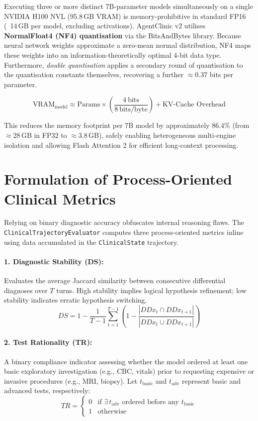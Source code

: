 Executing three or more distinct 7B-parameter models simultaneously on a single NVIDIA H100 NVL (95.8\,GB VRAM) is memory-prohibitive in standard FP16 (~14\,GB per model, excluding activations). AgentClinic v2 utilises \textbf{NormalFloat4 (NF4) quantisation} via the BitsAndBytes library. Because neural network weights approximate a zero-mean normal distribution, NF4 maps these weights into an information-theoretically optimal 4-bit data type. Furthermore, \textit{double quantisation} applies a secondary round of quantisation to the quantisation constants themselves, recovering a further $\approx$0.37 bits per parameter.

\begin{equation}
\text{VRAM}_{\text{model}} \approx \text{Params} \times \left( \frac{4\ \text{bits}}{8\ \text{bits/byte}} \right) + \text{KV-Cache Overhead}
\end{equation}

This reduces the memory footprint per 7B model by approximately 86.4\% (from $\approx$28\,GB in FP32 to $\approx$3.8\,GB), safely enabling heterogeneous multi-engine isolation and allowing Flash Attention 2 for efficient long-context processing.

\section{Formulation of Process-Oriented Clinical Metrics}

Relying on binary diagnostic accuracy obfuscates internal reasoning flaws. The \texttt{ClinicalTrajectoryEvaluator} computes three process-oriented metrics inline using data accumulated in the \texttt{ClinicalState} trajectory.

\paragraph{1. Diagnostic Stability (DS):} Evaluates the average Jaccard similarity between consecutive differential diagnoses over $T$ turns. High stability implies logical hypothesis refinement; low stability indicates erratic hypothesis switching.
\begin{equation}
DS = 1 - \frac{1}{T - 1} \sum_{t=1}^{T-1} \left( 1 - \frac{|DDx_t \cap DDx_{t+1}|}{|DDx_t \cup DDx_{t+1}|} \right)
\end{equation}

\paragraph{2. Test Rationality (TR):} A binary compliance indicator assessing whether the model ordered at least one basic exploratory investigation (e.g., CBC, vitals) prior to requesting expensive or invasive procedures (e.g., MRI, biopsy). Let $t_{\text{basic}}$ and $t_{\text{adv}}$ represent basic and advanced tests, respectively:
\begin{equation}
TR = \begin{cases}
0 & \text{if } \exists\, t_{\text{adv}} \text{ ordered before any } t_{\text{basic}} \\
1 & \text{otherwise}
\end{cases}
\end{equation}

